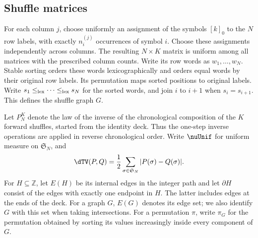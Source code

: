 \subsection{Shuffle matrices}
For each column $j$, choose uniformly an assignment of the symbols
$[k]_0$ to the $N$ row labels, with exactly $n_i^{(j)}$ occurrences of
symbol $i$. Choose these assignments independently across columns.
The resulting $N\times K$ matrix is uniform among all matrices with
the prescribed column counts. Write its row words as $w_1,\ldots,w_N$.
Stable sorting orders these words lexicographically and orders equal
words by their original row labels. Its permutation maps sorted
positions to original labels. Write $s_1\le_{\rm lex}\cdots\le_{\rm lex}s_N$
for the sorted words, and join $i$ to $i+1$ when $s_i=s_{i+1}$.
This defines the shuffle graph $G$.

Let $P_N^K$ denote the law of the inverse of the chronological
composition of the $K$ forward shuffles, started from the identity
deck. Thus the one-step inverse operations are applied in reverse
chronological order. Write $\nuUnif$ for uniform measure on
$\mathfrak S_N$, and
\[
 \dTV(P,Q)=\frac12\sum_{\sigma\in\mathfrak S_N}|P(\sigma)-Q(\sigma)|.
\]
For $H\subseteq\mathbb Z$, let $E(H)$ be its internal edges in the
integer path and let $\partial H$ consist of the edges with exactly
one endpoint in $H$. The latter includes edges at the ends of the
deck. For a graph $G$, $E(G)$ denotes its edge set; we also identify
$G$ with this set when taking intersections. For a permutation $\pi$,
write $\pi_G$ for the permutation obtained by sorting its values
increasingly inside every component of $G$.

